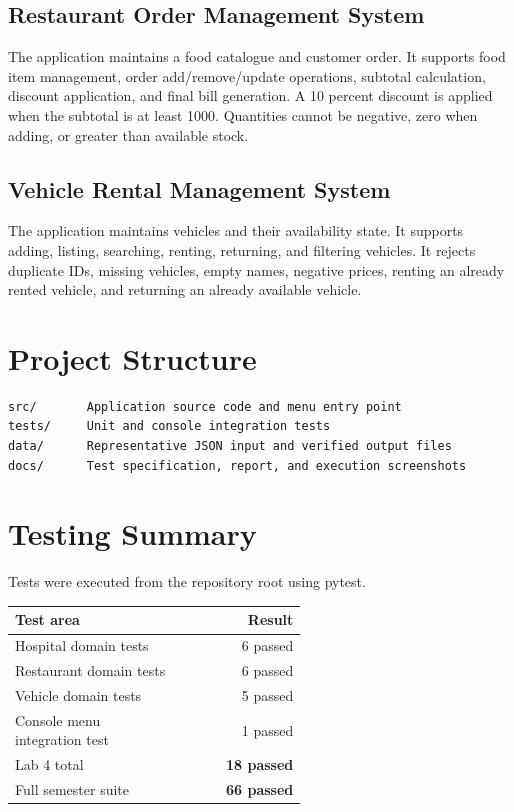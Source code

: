 \documentclass[11pt,a4paper]{article}
\newcommand{\result}[1]{\textcolor{brandgreen}{\textbf{#1}}}
\begin{document}
\subsection{Restaurant Order Management System}
The application maintains a food catalogue and customer order. It supports food
item management, order add/remove/update operations, subtotal calculation,
discount application, and final bill generation. A 10 percent discount is
applied when the subtotal is at least 1000. Quantities cannot be negative, zero
when adding, or greater than available stock.

\subsection{Vehicle Rental Management System}
The application maintains vehicles and their availability state. It supports
adding, listing, searching, renting, returning, and filtering vehicles. It
rejects duplicate IDs, missing vehicles, empty names, negative prices, renting
an already rented vehicle, and returning an already available vehicle.

\section{Project Structure}
\begin{verbatim}
src/       Application source code and menu entry point
tests/     Unit and console integration tests
data/      Representative JSON input and verified output files
docs/      Test specification, report, and execution screenshots
\end{verbatim}

\section{Testing Summary}

Tests were executed from the repository root using pytest.

\begin{center}
\begin{tabular}{>{\raggedright\arraybackslash}p{0.58\linewidth}r}
\toprule
\textbf{Test area} & \textbf{Result} \\
\midrule
Hospital domain tests & 6 passed \\
Restaurant domain tests & 6 passed \\
Vehicle domain tests & 5 passed \\
Console menu integration test & 1 passed \\
\midrule
Lab 4 total & \result{18 passed} \\
Full semester suite & \result{66 passed} \\
\bottomrule
\end{tabular}
\end{center}
\end{document}
